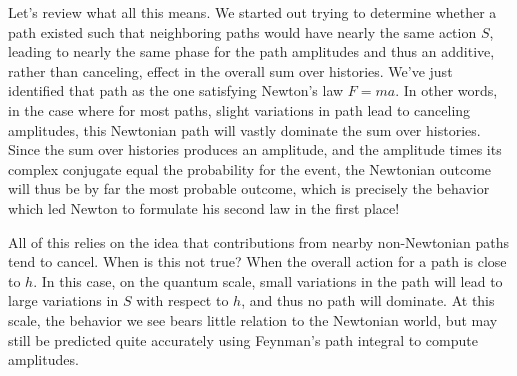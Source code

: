 \documentclass{amsart}
\newcommand{\qv}{q}
\begin{document}

Let's review what all this means.  We started out trying to determine whether a path existed such that neighboring paths would have nearly the same action $S$, leading to nearly the same phase for the path amplitudes and thus an additive, rather than canceling, effect in the overall sum over histories.  We've just identified that path as the one satisfying Newton's law $F = m a$.  In other words, in the case where for most paths, slight variations in path lead to canceling amplitudes, this Newtonian path will vastly dominate the sum over histories.  Since the sum over histories produces an amplitude, and the amplitude times its complex conjugate equal the probability for the event, the Newtonian outcome will thus be by far the most probable outcome, which is precisely the behavior which led Newton to formulate his second law in the first place!

All of this relies on the idea that contributions from nearby non-Newtonian paths tend to cancel.  When is this not true?  When the overall action for a path is close to $h$.  In this case, on the quantum scale, small variations in the path will lead to large variations in $S$ with respect to $h$, and thus no path will dominate.  At this scale, the behavior we see bears little relation to the Newtonian world, but may still be predicted quite accurately using Feynman's path integral to compute amplitudes.


\end{document}
